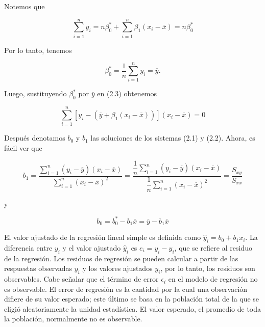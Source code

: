 Notemos que

\begin{equation}
    \sum_{i=1}^n y_i= n\beta_0^*+\sum_{i=1}^n \beta_1(x_i-\overline{x})=n\beta_0^*
\end{equation}

Por lo tanto, tenemos 

$$\beta_0^*=\dfrac{1}{n}\sum\limits_{i=1}^n y_i=\overline{y}.$$

Luego, sustituyendo $\beta_0^*$ por $\overline{y}$ en (2.3) obtenemos

$$\sum_{i=1}^n \left[y_i-(\overline{y} + \beta_1(x_i-\overline{x}))\right](x_i-\overline{x})=0$$

Después denotamos $b_0$ y $b_1$ las soluciones de los sistemas (2.1) y (2.2). Ahora, es fácil ver que
\begin{tcolorbox}
    \begin{equation}
	b_1=\dfrac{\sum\limits_{i=1}^n (y_i-\overline{y})(x_i-\overline{x})}{\sum\limits_{i=1}^n (x_i-\overline{x})^2}=\dfrac{\dfrac{1}{n}\sum\limits_{i=1}^n (y_i-\overline{y})(x_i-\overline{x})}{\dfrac{1}{n}\sum\limits_{i=1}^n (x_i-\overline{x})^2}=\dfrac{S_{xy}}{S_{xx}}
    \end{equation}
\end{tcolorbox}

y

\begin{tcolorbox}
    \begin{equation}
	b_0=b_0^*-b_1\overline{x}=\overline{y}-b_1\overline{x}
    \end{equation}
\end{tcolorbox}
\vspace{0.5cm}

El valor ajustado de la regresión lineal simple es definida como $\hat{y}_i=b_0+b_1x_i.$ La diferencia entre $y_i$ y el valor ajustado $\hat{y}_i$ es $e_i=y_i-\hat{y}_i$, que se refiere al residuo de la regresión. Los residuos de regresión se pueden calcular a partir de las respuestas observadas $y_i$ y los valores ajustados $y_i$, por lo tanto, los residuos son observables. Cabe señalar que el término de error $\epsilon_i$ en el modelo de regresión no es observable. El error de regresión es la cantidad por la cual una observación difiere de su valor esperado; este último se basa en la población total de la que se eligió aleatoriamente la unidad estadística. El valor esperado, el promedio de toda la población, normalmente no es observable.\\

